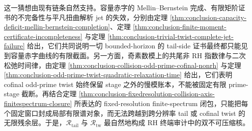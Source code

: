 这一猜想由现有链条自然支持。容量赤字的 Mellin--Bernstein 完成、有限矩阶证书的不完备性与平凡扭曲解析 jet 的失效，分别由定理 \ref{thm:conclusion-capacity-deficit-mellin-bernstein-completion}、定理 \ref{thm:conclusion-finite-moment-certificate-incompleteness} 与定理 \ref{thm:conclusion-trivial-twist-complete-jet-failure} 给出，它们共同说明一切 bounded-horizon 的 tail-side 证书最终都只能见到容量赤字曲线的有限截面。另一方面，奇素数模上的共尾非 RH 指数律与二次松弛时间律，由定理 \ref{thm:conclusion-collision-odd-prime-cofinal-nonrh} 与定理 \ref{thm:conclusion-odd-prime-twist-quadratic-relaxation-time} 给出，它们表明 cofinal odd-prime twist 始终保留 stage 之外的慢模账本，不能被固定有限 prime-stage 截断。再结合定理 \ref{thm:conclusion-fixedresolution-collision-axis-finitespectrum-closure} 所表达的 fixed-resolution finite-spectrum 闭包，只能把每个固定窗口封成局部有限谱对象，而无法跨越到跨分辨率 tail 或 cofinal twist 的无限残余层。于是，\(\mathcal R_{\mathrm{tail}}\) 与 \(\mathcal R_{\mathrm{tw}}\) 最自然地构成 RH 终端审计中的双不可压缩核。
